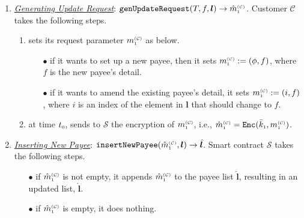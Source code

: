 \begin{enumerate}[leftmargin=.46cm]
\item\label{genUpdateRequest}  {\underline{\textit{Generating  Update Request}}: $\mathtt{genUpdateRequest}(T, f, {\bm l})\rightarrow \hat m^{\scriptscriptstyle\mathcal{(C)}}_{\scriptscriptstyle 1}$}.
%
Customer $\mathcal{C}$ takes the following steps. 

\begin{enumerate}
%
\item sets its request parameter $m_{\scriptscriptstyle 1}^{\scriptscriptstyle(\mathcal C)}$ as below. 
%
\begin{itemize}

\item[$\bullet$] if it wants to set up a new payee, then it sets $m_{\scriptscriptstyle 1}^{\scriptscriptstyle(\mathcal C)}:=(\phi,f)$, where $f$ is the new payee's detail.  %

%
\item[$\bullet$] if it wants to amend the existing payee's detail,   it sets $m_{\scriptscriptstyle 1}^{\scriptscriptstyle(\mathcal C)}:=(i, f)$, where $i$ is an index of the element in $\bm l$ that should  change to $f$.  %



\end{itemize}
\item\label{send-update-req} at time $t_{\scriptscriptstyle 0}$, sends to $\mathcal{S}$  the encryption of $m_{\scriptscriptstyle 1}^{\scriptscriptstyle(\mathcal C)}$, i.e., $\hat m_{\scriptscriptstyle 1}^{\scriptscriptstyle(\mathcal C)}=\mathtt{Enc}(\bar k_{\scriptscriptstyle 1}, m_{\scriptscriptstyle 1}^{\scriptscriptstyle(\mathcal C)})$. 
\end{enumerate}
%

 \item \underline{\textit{Inserting New Payee}}: $\mathtt{insertNewPayee}(\hat m^{\scriptscriptstyle\mathcal{(C)}}_{\scriptscriptstyle 1}, {\bm l})\rightarrow {\hat{\bm l}}$.
Smart contract $\mathcal{S}$ takes the following steps. 
 \begin{itemize}
 \item[$\bullet$] if $\hat m_{\scriptscriptstyle 1}^{\scriptscriptstyle(\mathcal C)}$  is not empty, it appends $\hat m_{\scriptscriptstyle 1}^{\scriptscriptstyle(\mathcal C)}$ to the payee list $\hat{\bm l}$, resulting in an updated list, $\hat{\bm l}$. 
  \item[$\bullet$] if $\hat m_{\scriptscriptstyle 1}^{\scriptscriptstyle(\mathcal C)}$ is empty,  it does nothing. 
 \end{itemize}
 

\end{enumerate}
